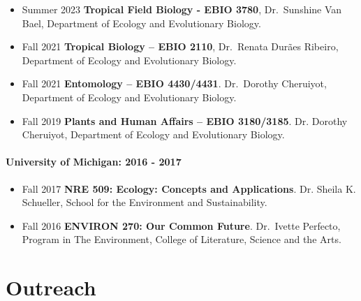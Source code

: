 \documentclass[11pt,a4paper,]{awesome-cv}
\begin{document}
\begin{itemize}
\item
  Summer 2023 \textbar{} \textbf{Tropical Field Biology - EBIO 3780},
  Dr.~Sunshine Van Bael, Department of Ecology and Evolutionary Biology.
\item
  Fall 2021 \textbar{} \textbf{Tropical Biology -- EBIO 2110},
  Dr.~Renata Durães Ribeiro, Department of Ecology and Evolutionary
  Biology.
\item
  Fall 2021 \textbar{} \textbf{Entomology -- EBIO 4430/4431}.
  Dr.~Dorothy Cheruiyot, Department of Ecology and Evolutionary Biology.
\item
  Fall 2019 \textbar{} \textbf{Plants and Human Affairs -- EBIO
  3180/3185}. Dr. Dorothy Cheruiyot, Department of Ecology and
  Evolutionary Biology.
\end{itemize}

\hypertarget{university-of-michigan-2016---2017}{%
\paragraph{University of Michigan: 2016 -
2017}\label{university-of-michigan-2016---2017}}

\begin{itemize}
\item
  Fall 2017 \textbar{} \textbf{NRE 509: Ecology: Concepts and
  Applications}. Dr. Sheila K. Schueller, School for the Environment and
  Sustainability.
\item
  Fall 2016 \textbar{} \textbf{ENVIRON 270: Our Common Future}.
  Dr.~Ivette Perfecto, Program in The Environment, College of
  Literature, Science and the Arts.\\
\end{itemize}

\hypertarget{outreach}{%
\section{\texorpdfstring{
Outreach}{ Outreach}}\label{outreach}}

\begin{cventries}
\end{cventries}
\end{document}
